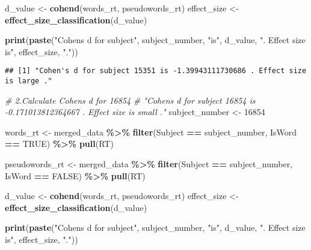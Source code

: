 \documentclass[
]{article}
\newenvironment{Shaded}{\begin{snugshade}}{\end{snugshade}}
\newcommand{\CommentTok}[1]{\textcolor[rgb]{0.56,0.35,0.01}{\textit{#1}}}
\newcommand{\ConstantTok}[1]{\textcolor[rgb]{0.56,0.35,0.01}{#1}}
\newcommand{\DecValTok}[1]{\textcolor[rgb]{0.00,0.00,0.81}{#1}}
\newcommand{\FunctionTok}[1]{\textcolor[rgb]{0.13,0.29,0.53}{\textbf{#1}}}
\newcommand{\NormalTok}[1]{#1}
\newcommand{\OtherTok}[1]{\textcolor[rgb]{0.56,0.35,0.01}{#1}}
\newcommand{\SpecialCharTok}[1]{\textcolor[rgb]{0.81,0.36,0.00}{\textbf{#1}}}
\newcommand{\StringTok}[1]{\textcolor[rgb]{0.31,0.60,0.02}{#1}}
\begin{document}
\begin{Shaded}
\begin{Highlighting}[]
\NormalTok{d\_value }\OtherTok{\textless{}{-}} \FunctionTok{cohend}\NormalTok{(words\_rt, pseudowords\_rt)}
\NormalTok{effect\_size }\OtherTok{\textless{}{-}} \FunctionTok{effect\_size\_classification}\NormalTok{(d\_value)}

\FunctionTok{print}\NormalTok{(}\FunctionTok{paste}\NormalTok{(}\StringTok{"Cohen\textquotesingle{}s d for subject"}\NormalTok{, subject\_number, }\StringTok{"is"}\NormalTok{, d\_value, }\StringTok{". Effect size is"}\NormalTok{, effect\_size, }\StringTok{"."}\NormalTok{))}
\end{Highlighting}
\end{Shaded}

\begin{verbatim}
## [1] "Cohen's d for subject 15351 is -1.39943111730686 . Effect size is large ."
\end{verbatim}

\begin{Shaded}
\begin{Highlighting}[]
\CommentTok{\# 2.Calculate Cohen\textquotesingle{}s d for 16854}
\CommentTok{\#  "Cohen\textquotesingle{}s d for subject 16854 is {-}0.171013812364667 . Effect size is small ."}
\NormalTok{subject\_number }\OtherTok{\textless{}{-}} \DecValTok{16854}

\NormalTok{words\_rt }\OtherTok{\textless{}{-}}\NormalTok{ merged\_data }\SpecialCharTok{\%\textgreater{}\%}
  \FunctionTok{filter}\NormalTok{(Subject }\SpecialCharTok{==}\NormalTok{ subject\_number, IsWord }\SpecialCharTok{==} \ConstantTok{TRUE}\NormalTok{) }\SpecialCharTok{\%\textgreater{}\%}
  \FunctionTok{pull}\NormalTok{(RT)}

\NormalTok{pseudowords\_rt }\OtherTok{\textless{}{-}}\NormalTok{ merged\_data }\SpecialCharTok{\%\textgreater{}\%}
  \FunctionTok{filter}\NormalTok{(Subject }\SpecialCharTok{==}\NormalTok{ subject\_number, IsWord }\SpecialCharTok{==} \ConstantTok{FALSE}\NormalTok{) }\SpecialCharTok{\%\textgreater{}\%}
  \FunctionTok{pull}\NormalTok{(RT)}

\NormalTok{d\_value }\OtherTok{\textless{}{-}} \FunctionTok{cohend}\NormalTok{(words\_rt, pseudowords\_rt)}
\NormalTok{effect\_size }\OtherTok{\textless{}{-}} \FunctionTok{effect\_size\_classification}\NormalTok{(d\_value)}

\FunctionTok{print}\NormalTok{(}\FunctionTok{paste}\NormalTok{(}\StringTok{"Cohen\textquotesingle{}s d for subject"}\NormalTok{, subject\_number, }\StringTok{"is"}\NormalTok{, d\_value, }\StringTok{". Effect size is"}\NormalTok{, effect\_size, }\StringTok{"."}\NormalTok{))}
\end{Highlighting}
\end{Shaded}
\end{document}
